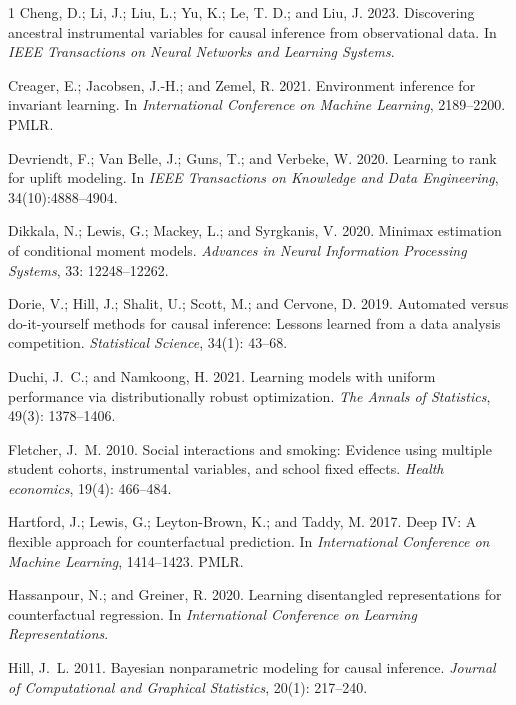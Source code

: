 \documentclass[journal]{IEEEtran}
\begin{document}
\begin{thebibliography}{1}
Cheng, D.; Li, J.; Liu, L.; Yu, K.; Le, T. D.; and Liu, J. 2023.
\newblock Discovering ancestral instrumental variables for causal inference from observational data.
\newblock In \emph{IEEE Transactions on Neural Networks and Learning Systems}.

Creager, E.; Jacobsen, J.-H.; and Zemel, R. 2021.
\newblock Environment inference for invariant learning.
\newblock In \emph{International Conference on Machine Learning}, 2189--2200. PMLR.

Devriendt, F.; Van Belle, J.; Guns, T.; and Verbeke, W. 2020.
\newblock Learning to rank for uplift modeling.
\newblock In \emph{IEEE Transactions on Knowledge and Data Engineering}, 34(10):4888--4904.

Dikkala, N.; Lewis, G.; Mackey, L.; and Syrgkanis, V. 2020.
\newblock Minimax estimation of conditional moment models.
\newblock \emph{Advances in Neural Information Processing Systems}, 33: 12248--12262.

Dorie, V.; Hill, J.; Shalit, U.; Scott, M.; and Cervone, D. 2019.
\newblock Automated versus do-it-yourself methods for causal inference: Lessons learned from a data analysis competition.
\newblock \emph{Statistical Science}, 34(1): 43--68.

Duchi, J.~C.; and Namkoong, H. 2021.
\newblock Learning models with uniform performance via distributionally robust optimization.
\newblock \emph{The Annals of Statistics}, 49(3): 1378--1406.

Fletcher, J.~M. 2010.
\newblock Social interactions and smoking: Evidence using multiple student cohorts, instrumental variables, and school fixed effects.
\newblock \emph{Health economics}, 19(4): 466--484.

Hartford, J.; Lewis, G.; Leyton-Brown, K.; and Taddy, M. 2017.
\newblock Deep IV: A flexible approach for counterfactual prediction.
\newblock In \emph{International Conference on Machine Learning}, 1414--1423. PMLR.

Hassanpour, N.; and Greiner, R. 2020.
\newblock Learning disentangled representations for counterfactual regression.
\newblock In \emph{International Conference on Learning Representations}.

Hill, J.~L. 2011.
\newblock Bayesian nonparametric modeling for causal inference.
\newblock \emph{Journal of Computational and Graphical Statistics}, 20(1): 217--240.


\end{thebibliography}
\end{document}

